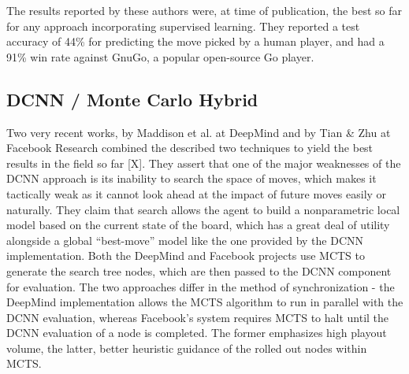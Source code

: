 The results reported by these authors were, at time of publication, the best so far for any approach incorporating supervised learning. They reported a test accuracy of 44\% for predicting the move picked by a human player, and had a 91\% win rate against GnuGo, a popular open-source Go player. 

\subsection{DCNN / Monte Carlo Hybrid}

Two very recent works, by Maddison et al. at DeepMind and by Tian \& Zhu at Facebook Research combined the described two techniques to yield the best results in the field so far [X]. They assert that one of the major weaknesses of the DCNN approach is its inability to search the space of moves, which makes it tactically weak as it cannot look ahead at the impact of future moves easily or naturally. They claim that search allows the agent to build a nonparametric local model based on the current state of the board, which has a great deal of utility alongside a global ``best-move'' model like the one provided by the DCNN implementation. Both the DeepMind and Facebook projects use MCTS to generate the search tree nodes, which are then passed to the DCNN component for evaluation. The two approaches differ in the method of synchronization - the DeepMind implementation allows the MCTS algorithm to run in parallel with the DCNN evaluation, whereas Facebook's system requires MCTS to halt until the DCNN evaluation of a node is completed. The former emphasizes high playout volume, the latter, better heuristic guidance of the rolled out nodes within MCTS. 